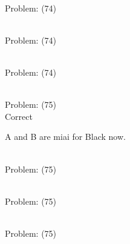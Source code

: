 \documentclass[11pt]{article}
\begin{document}
\begin{minipage}[t]{0.5\textwidth}
  {\centering
  
\\
Problem: (74)\\
  }
\end{minipage}
\begin{minipage}[t]{0.5\textwidth}
  {\centering
  
\\
Problem: (74)\\
  }
\end{minipage}
\begin{minipage}[t]{0.5\textwidth}
  {\centering
  
\\
Problem: (74)\\
  }
\end{minipage}
\begin{minipage}[t]{0.5\textwidth}
  {\centering
  
\\
Problem: (75)\\
Correct

A and B are miai for Black now.\\
  }
\end{minipage}
\begin{minipage}[t]{0.5\textwidth}
  {\centering
  
\\
Problem: (75)\\
  }
\end{minipage}
\begin{minipage}[t]{0.5\textwidth}
  {\centering
  
\\
Problem: (75)\\
  }
\end{minipage}
\begin{minipage}[t]{0.5\textwidth}
  {\centering
  
\\
Problem: (75)\\
  }
\end{minipage}
\end{document}

